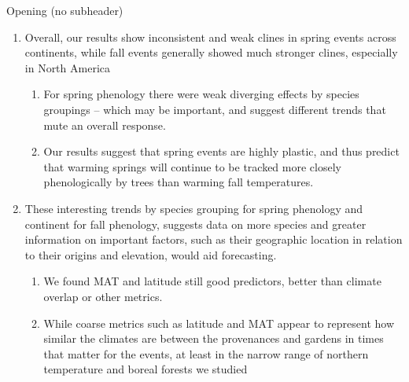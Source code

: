 \documentclass{article}
\begin{document}
Opening (no subheader) 
\begin{enumerate}
\item Overall, our results show inconsistent and weak clines in spring events across continents, while fall events generally showed much stronger clines, especially in North America
\begin{enumerate}
\item For spring phenology there were weak diverging effects by species groupings -- which may be important, and suggest different trends that mute an overall response. 
\item Our results suggest that spring events are highly plastic, and thus predict that warming springs will continue to be tracked more closely phenologically by trees than warming fall temperatures.  %
\end{enumerate}
\item  These interesting trends by species grouping for spring phenology and continent for fall phenology, suggests data on more species and greater information on important factors, such as their geographic location in relation to their origins and elevation, would aid forecasting. 
\begin{enumerate}
\item We found MAT and latitude still good predictors, better than climate overlap or other metrics. 
\item While coarse metrics such as latitude and MAT appear to represent how similar the climates are between the provenances and gardens in times that matter for the events, at least in the narrow range of northern temperature and boreal forests we studied
\end{enumerate}
\end{enumerate}
\end{document}
